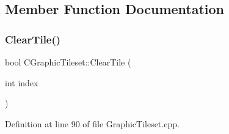 \subsection{Member Function Documentation}
\hypertarget{classCGraphicTileset_aefeefc9e2ad01ceb8a781bd455859f76}{}\label{classCGraphicTileset_aefeefc9e2ad01ceb8a781bd455859f76} 
\subsubsection{\texorpdfstring{Clear\+Tile()}{ClearTile()}}
{\footnotesize\ttfamily bool C\+Graphic\+Tileset\+::\+Clear\+Tile (\begin{DoxyParamCaption}\item[{int}]{index }\end{DoxyParamCaption})}



Definition at line 90 of file Graphic\+Tileset.\+cpp.


